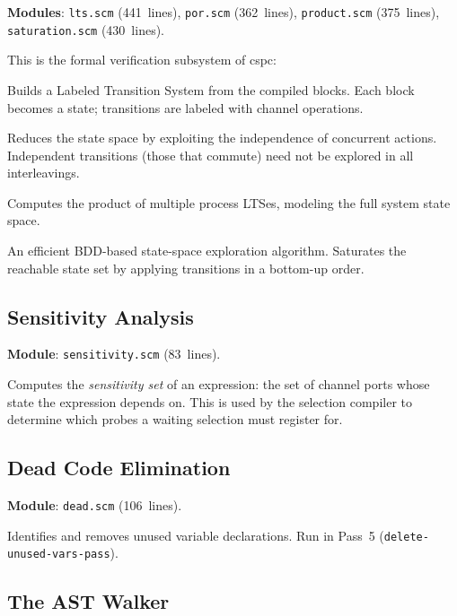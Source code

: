 \documentclass[11pt,letterpaper]{article}
\begin{document}
\textbf{Modules}: \texttt{lts.scm} (441~lines), \texttt{por.scm}
(362~lines), \texttt{product.scm} (375~lines),
\texttt{saturation.scm} (430~lines).

This is the formal verification subsystem of cspc:

\begin{description}[style=nextline]
  \item[LTS construction (\texttt{lts.scm})]
    Builds a Labeled Transition System from the compiled blocks.
    Each block becomes a state; transitions are labeled with
    channel operations.

  \item[Partial Order Reduction (\texttt{por.scm})]
    Reduces the state space by exploiting the independence of
    concurrent actions.  Independent transitions (those that
    commute) need not be explored in all interleavings.

  \item[Product construction (\texttt{product.scm})]
    Computes the product of multiple process LTSes, modeling the
    full system state space.

  \item[Saturation (\texttt{saturation.scm})]
    An efficient BDD-based state-space exploration algorithm.
    Saturates the reachable state set by applying transitions
    in a bottom-up order.
\end{description}

\subsection{Sensitivity Analysis}

\textbf{Module}: \texttt{sensitivity.scm} (83~lines).

Computes the \emph{sensitivity set} of an expression: the set of
channel ports whose state the expression depends on.  This is used
by the selection compiler to determine which probes a waiting
selection must register for.

\subsection{Dead Code Elimination}

\textbf{Module}: \texttt{dead.scm} (106~lines).

Identifies and removes unused variable declarations.  Run in Pass~5
(\texttt{delete-unused-vars-pass}).

\subsection{The AST Walker}
\end{document}
